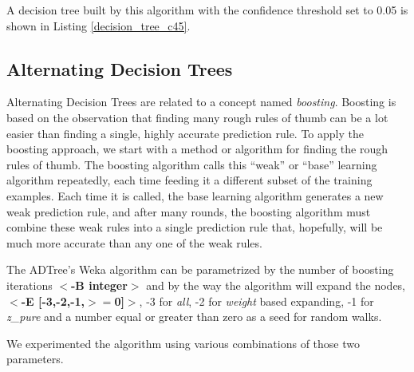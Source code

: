 \documentclass[a4paper]{llncs}
\begin{document}
A decision tree built by this algorithm with the confidence threshold set to 0.05 is shown in Listing \ref{decision_tree_c45}.

\subsection{Alternating Decision Trees}

Alternating Decision Trees are related to a concept named \textit{boosting}.
Boosting is based on the observation that finding many rough rules of thumb can be a lot easier 
than finding a single, highly accurate prediction rule. To apply the boosting approach,
we start with a method or algorithm for finding the rough rules of thumb. 
The boosting algorithm calls this “weak” or “base” learning algorithm repeatedly, 
each time feeding it a different subset of the training examples. Each time 
it is called, the base learning algorithm generates a new weak prediction rule, and 
after many rounds, the boosting algorithm must combine these weak rules into a 
single prediction rule that, hopefully, will be much more accurate than any one of 
the weak rules. \cite{boosting}

The ADTree's Weka algorithm can be parametrized by the number of boosting iterations
\textbf{$<$-B integer$>$} and by the way the algorithm will expand the nodes,
\textbf{$<$-E [-3,-2,-1,$>=$0]$>$},
-3 for \textit{all}, -2 for \textit{weight} based expanding,
-1 for \textit{z\_pure} and a number
equal or greater than zero as a seed for random walks.

We experimented the algorithm using various combinations of those two parameters.
\end{document}
